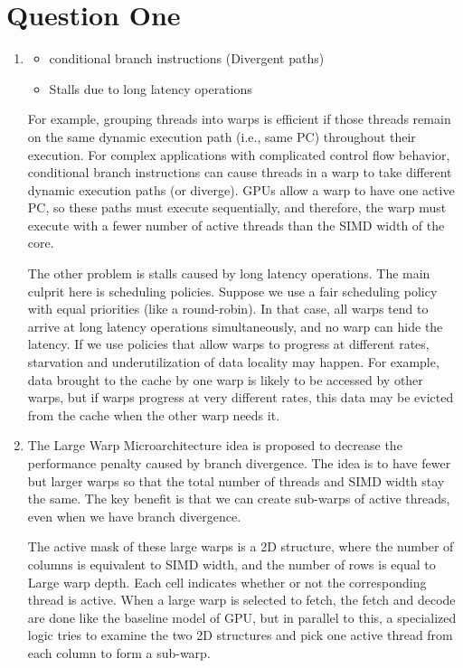 \documentclass[12pt]{article}
\begin{document}
\section{Question One}
\begin{enumerate}[label=\alph*)]
	\item 
	
	\begin{itemize}
		\item conditional branch instructions (Divergent paths)
		
		\item Stalls
		due to long latency operations
	\end{itemize}

For example, grouping threads into warps is efficient if those threads remain on the same dynamic execution path (i.e., same PC) throughout their execution. For complex applications with complicated control flow behavior, conditional branch instructions can cause threads in a warp to take different dynamic execution paths (or diverge). GPUs allow a warp to have one active PC, so these paths must execute sequentially, and therefore, the warp must execute with a fewer number of active threads than the SIMD width of the core.

The other problem is stalls caused by long latency operations. The main culprit here is scheduling policies. Suppose we use a fair scheduling policy with equal priorities (like a round-robin). In that case, all warps tend to arrive at long latency operations simultaneously, and no warp can hide the latency. If we use policies that allow warps to progress at different rates,  starvation and underutilization of data locality may happen. For example, data brought to the cache by one warp is likely to be accessed by other warps, but if warps progress at very different rates, this data may be evicted from the cache when the other warp needs it.

\item

The Large Warp Microarchitecture idea is proposed to decrease the performance penalty caused by branch divergence. The idea is to have fewer but larger warps so that the total number of threads and SIMD width stay the same. The key benefit is that we can create sub-warps of active threads, even when we have branch divergence.

The active mask of these large warps is a 2D structure, where the number of columns is equivalent to SIMD width, and the number of rows is equal to Large warp depth. Each cell indicates whether or not the corresponding thread is active. When a large warp is selected to fetch, the fetch and decode are done like the baseline model of GPU, but in parallel to this, a specialized logic tries to examine the two 2D structures and pick one active thread from each column to form a sub-warp.


\end{enumerate}
\end{document}

